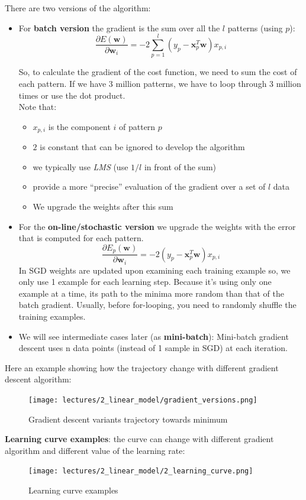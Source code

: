 \documentclass[../main.tex]{subfiles}
\begin{document}
There are two versions of the algorithm:
\begin{itemize}
    \item For \textbf{batch version} the gradient is the sum over all the $l$ patterns (using $p$):
$$\frac{\partial E(\mathbf{w})}{\partial\mathbf{w}_i} = -2\sum_{p = 1}^{l} (y_p - \mathbf{x}_p^T\mathbf{w})x_{p,i}$$

So, to calculate the gradient of the cost function, we need to sum the cost of each pattern. If we have 3 million patterns, we have to loop through 3 million times or use the dot product.\\
\noindent Note that:
\begin{itemize}
    \item $x_{p,i}$ is the component $i$ of pattern $p$
    \item $2$ is constant that can be ignored to develop the algorithm
    \item we typically use \emph{LMS} (use $1/l$ in front of the sum)
    \item provide a more “precise” evaluation of the gradient over a set of $l$ data
    \item We upgrade the weights after this sum
\end{itemize}

\item For the \textbf{on-line/stochastic version} we upgrade the weights with the error that is computed for each pattern.
$$\frac{\partial E_p(\mathbf{w})}{\partial\mathbf{w}_i} = -2(y_p - \mathbf{x}_p^T\mathbf{w})x_{p,i}$$
In SGD weights are updated upon examining each training example so, we only use 1 example for each learning step. Because it’s using only one example at a time, its path to the minima more random than that of the batch gradient. Usually, before for-looping, you need to randomly shuffle the training examples.
\item We will see intermediate cases later (as \textbf{mini-batch}): Mini-batch gradient descent uses n data points (instead of 1 sample in SGD) at each iteration.
\end{itemize}
Here an example showing how the trajectory change with different gradient descent algorithm:
\begin{figure}[H]
    \centering
    \texttt{[image: lectures/2\_linear\_model/gradient\_versions.png]}
    \caption{Gradient descent variants trajectory towards minimum}
    \label{fig:2_gradient_trajectory}
\end{figure}

\noindent \textbf{Learning curve examples}: the curve can change with different gradient algorithm and different value of the learning rate:
\begin{figure}[H]
    \centering
    \texttt{[image: lectures/2\_linear\_model/2\_learning\_curve.png]}
    \caption{Learning curve examples}
    \label{fig:2_learning_curve}
\end{figure}
\end{document}
